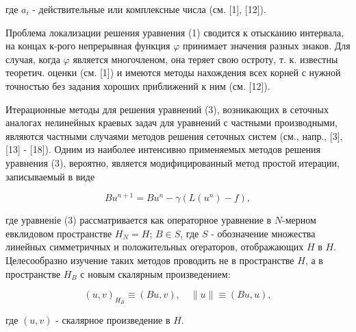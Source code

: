 \documentclass[10pt]{article}
\begin{document}
где $a_{i}$ - действительные или комплексные числа (см. [1], [12]).



Проблема локализации решения уравнения (1) сводится к отысканию интервала, на концах к-рого непрерывная функция $\varphi$ принимает значения разных знаков. Для случая, когда $\varphi$ является многочленом, она теряет свою остроту, т. к. известны теоретич. оценки (см. [1]) и имеются методы нахождения всех корней с нужной точностью без задания хороших приближений к ним (см. [12]).



Итерационные методы для решения уравнений (3), возникающих в сеточных аналогах нелинейных краевых задач для уравнений с частными производными, являются частными случаями методов решения сеточных систем (см., напр., [3], [13] - [18]). Одним из наиболее интенсивно применяемых методов решения уравнения (3), вероятно, является модифицированный метод простой итерации, записываемый в виде



\[

B u^{n+1}=B u^{n}-\gamma\left(L\left(u^{n}\right)-f\right),

\]



где уравненіе (3) рассматривается как операторное уравнение в $N$-мерном евклидовом пространстве $H_{N}=H$; $B \in S$, где $S$ - обозначение множества линейных симметричных и положительных огераторов, отображающих $H$ в $H$. Целесообразно изучение таких методов проводить не в пространстве $H$, а в пространстве $H_{B}$ с новым скалярным произведением:



\[

(u, v)_{H_{B}} \equiv(B u, v), \quad\|u\| \equiv(B u, u),

\]



где $(u, v)$ - скалярное произведение в $H$.
\end{document}
